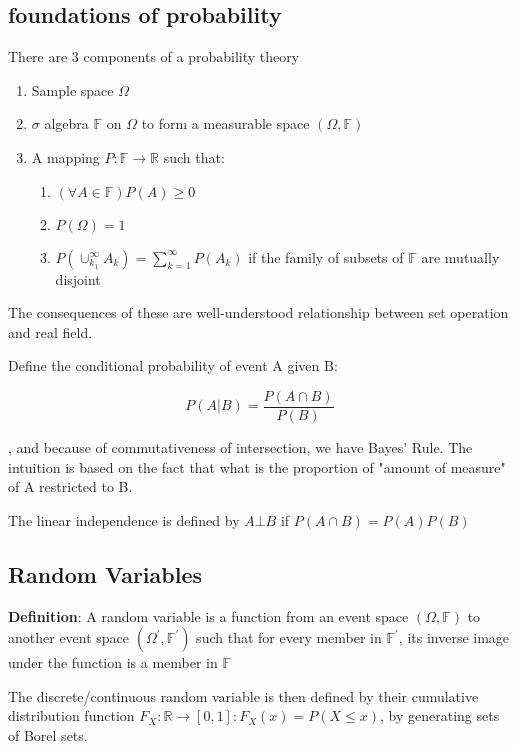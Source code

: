 \documentclass{article}
\begin{document}
\subsection{foundations of probability}

There are 3 components of a probability theory

\begin{enumerate}
\item Sample space $\Omega$
\item $\sigma$ algebra $\mathbb{F}$ on $\Omega$ to form a measurable space $(\Omega,\mathbb{F})$
\item A mapping $P: \mathbb{F}\to\mathbb{R}$ such that:
	\begin{enumerate}
	\item $(\forall A\in\mathbb{F})P(A)\ge 0$
	\item $P(\Omega)=1$
	\item $P(\cup_{k_1}^\infty A_k)=\sum_{k=1}^\infty P(A_k)$ if the family of subsets of $\mathbb{F}$ are mutually disjoint
	\end{enumerate}

\end{enumerate}

The consequences of these are well-understood relationship between set operation and 
real field.

Define the conditional probability of event A given B:

$$
P(A|B) = \frac{P(A\cap B)}{P(B)} 
$$

, and because of commutativeness of intersection, we have Bayes' Rule.
The intuition is based on the fact that what is the proportion of "amount of measure" 
of A restricted to B.


The linear independence is defined by $A\bot B$ if $P(A\cap B)=P(A)P(B)$

\subsection{Random Variables}

\textbf{Definition}: A random variable is a function from an event space $(\Omega,\mathbb{F})$
to another event space $(\Omega^\prime,\mathbb{F}^\prime)$ such that for every member
in $\mathbb{F}^\prime$, its inverse image under the function is a member in $\mathbb{F}$

The discrete/continuous random variable is then defined by their cumulative distribution
function $F_X: \mathbb{R}\to[0,1]: F_X(x)=P(X\le x)$, by generating sets of Borel sets.
\end{document}
